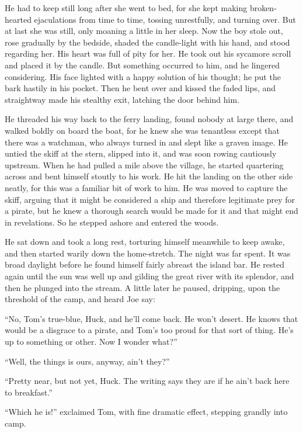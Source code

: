 \documentclass{book}
\begin{document}
He had to keep still long after she went to bed, for she kept making broken-hearted ejaculations from time to time, tossing unrestfully, and turning over. But at last she was still, only moaning a little in her sleep. Now the boy stole out, rose gradually by the bedside, shaded the candle-light with his hand, and stood regarding her. His heart was full of pity for her. He took out his sycamore scroll and placed it by the candle. But something occurred to him, and he lingered considering. His face lighted with a happy solution of his thought; he put the bark hastily in his pocket. Then he bent over and kissed the faded lips, and straightway made his stealthy exit, latching the door behind him.

He threaded his way back to the ferry landing, found nobody at large there, and walked boldly on board the boat, for he knew she was tenantless except that there was a watchman, who always turned in and slept like a graven image. He untied the skiff at the stern, slipped into it, and was soon rowing cautiously upstream. When he had pulled a mile above the village, he started quartering across and bent himself stoutly to his work. He hit the landing on the other side neatly, for this was a familiar bit of work to him. He was moved to capture the skiff, arguing that it might be considered a ship and therefore legitimate prey for a pirate, but he knew a thorough search would be made for it and that might end in revelations. So he stepped ashore and entered the woods.

He sat down and took a long rest, torturing himself meanwhile to keep awake, and then started warily down the home-stretch. The night was far spent. It was broad daylight before he found himself fairly abreast the island bar. He rested again until the sun was well up and gilding the great river with its splendor, and then he plunged into the stream. A little later he paused, dripping, upon the threshold of the camp, and heard Joe say:

“No, Tom’s true-blue, Huck, and he’ll come back. He won’t desert. He knows that would be a disgrace to a pirate, and Tom’s too proud for that sort of thing. He’s up to something or other. Now I wonder what?”

“Well, the things is ours, anyway, ain’t they?”

“Pretty near, but not yet, Huck. The writing says they are if he ain’t back here to breakfast.”

“Which he is!” exclaimed Tom, with fine dramatic effect, stepping grandly into camp.
\end{document}

